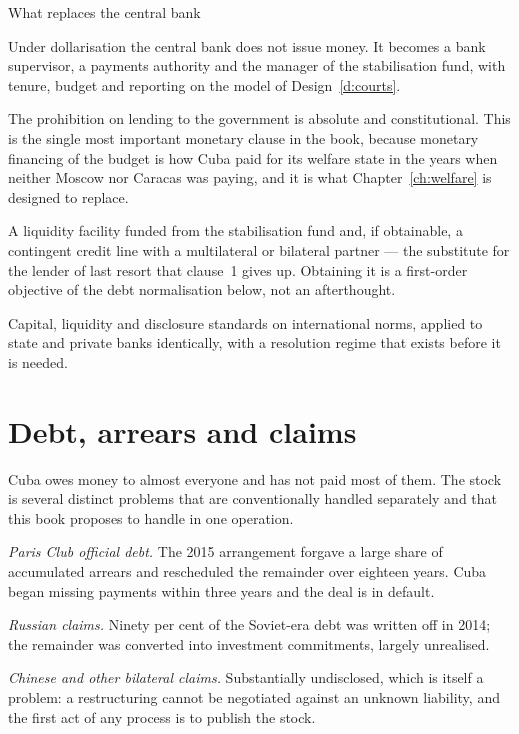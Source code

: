 \begin{design}{What replaces the central bank}
\label{d:bank}
\begin{rules}
 Under dollarisation the central bank does not issue money. It
becomes a bank supervisor, a payments authority and the manager of the
stabilisation fund, with tenure, budget and reporting on the model of
Design~\ref{d:courts}.

 The prohibition on lending to the government is
absolute and constitutional. This is the single most important monetary clause in
the book, because monetary financing of the budget is how Cuba paid for its
welfare state in the years when neither Moscow nor Caracas was paying, and it is
what Chapter~\ref{ch:welfare} is designed to replace.

 A liquidity facility funded from the stabilisation fund and,
if obtainable, a contingent credit line with a multilateral or bilateral partner
--- the substitute for the lender of last resort that clause~1 gives up.
Obtaining it is a first-order objective of the debt normalisation below, not an
afterthought.

 Capital, liquidity and disclosure standards on
international norms, applied to state and private banks identically, with a
resolution regime that exists before it is needed.
\end{rules}
\end{design}

\section{Debt, arrears and claims}

Cuba owes money to almost everyone and has not paid most of them. The stock is
several distinct problems that are conventionally handled separately and that
this book proposes to handle in one operation.

\emph{Paris Club official debt.} The 2015 arrangement forgave a large share of
accumulated arrears and rescheduled the remainder over eighteen years. Cuba
began missing payments within three years and the deal is in default.

\emph{Russian claims.} Ninety per cent of the Soviet-era debt was written off in
2014; the remainder was converted into investment commitments, largely
unrealised.

\emph{Chinese and other bilateral claims.} Substantially undisclosed, which is
itself a problem: a restructuring cannot be negotiated against an unknown
liability, and the first act of any process is to publish the stock.

